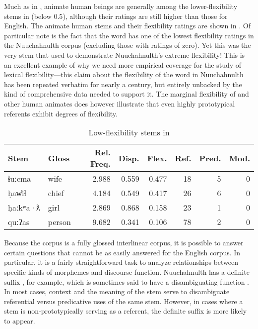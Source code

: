 Much as in , animate human beings are generally among the lower-flexibility stems in  (below $0.5$), although their ratings are still higher than those for English. The animate human stems and their flexibility ratings are shown in . Of particular note is the fact that the word   has one of the lowest flexibility ratings in the Nuuchahnulth corpus (excluding those with ratings of zero). Yet this was the very stem that \textcite{Swadesh1939b} used to demonstrate Nuuchahnulth's extreme flexibility! This is an excellent example of why we need more empirical coverage for the study of lexical flexibility—this claim about the flexibility of the word  in Nuuchahnulth has been repeated verbatim for nearly a century, but entirely unbacked by the kind of comprehensive data needed to support it. The marginal flexibility of  and other human animates does however illustrate that even highly prototypical referents exhibit degrees of flexibility.

\begin{table}
  \centering
  \caption{Low-flexibility stems in }
  \label{tab:Nuuchahnulth-low-flexibility}
  \begin{tabular}{ l l r r r r r r }
    \toprule
    Stem     & Gloss  & Rel. Freq. & Disp. & Flex. & Ref. & Pred. & Mod.\\
    \midrule
    ɬuːcma   & wife   & 2.988      & 0.559 & 0.477 & 18   & 5     & 0  \\
    ḥaw̓iɬ    & chief  & 4.184      & 0.549 & 0.417 & 26   & 6     & 0  \\
    ḥaːkʷa·ƛ & girl   & 2.869      & 0.868 & 0.158 & 23   & 1     & 0  \\
    quːʔas   & person & 9.682      & 0.341 & 0.106 & 78   & 2     & 0  \\
    \bottomrule
  \end{tabular}
\end{table}

Because the  corpus is a fully glossed interlinear corpus, it is possible to answer certain questions that cannot be as easily answered for the English corpus. In particular, it is a fairly straightforward task to analyze relationships between specific kinds of morphemes and discourse function. Nuuchahnulth has a definite suffix , for example, which is sometimes said to have a disambiguating function \parencites[60-63]{Mithun1999}[48]{Nakayama2001}. In most cases, context and the meaning of the stem serve to disambiguate referential versus predicative uses of the same stem. However, in cases where a stem is non-prototypically serving as a referent, the definite suffix is more likely to appear.

